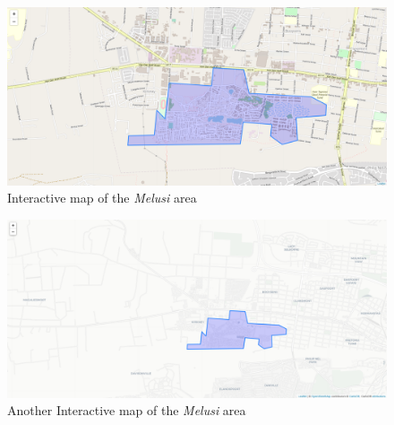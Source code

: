 \begin{figure}[!ht]
\centering
\includegraphics[scale=0.35,angle=90]{Figures/Chapter3/Folium}
\caption{Interactive map of the \textit{Melusi} area}
\label{fig:fol}
\end{figure}
\pagebreak
\begin{figure}[!ht]
\centering
\includegraphics[scale=0.6,angle=90]{Figures/Chapter3/Folium2}
\caption{Another Interactive map of the \textit{Melusi} area}
\label{fig:fol2}
\end{figure}